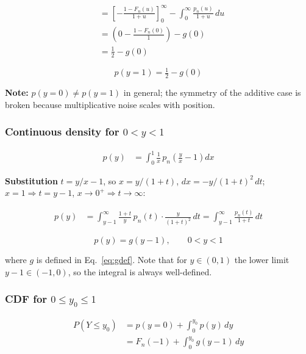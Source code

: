 \begin{align*}
  &= \left[-\frac{1-F_n(u)}{1+u}\right]_0^{\infty}
     - \int_0^{\infty} \frac{p_n(u)}{1+u}\,du \\
  &= \left(0 - \frac{1-F_n(0)}{1}\right) - g(0) \\
  &= \frac{1}{2} - g(0)
\end{align*}

\begin{equation}
  \boxed{p(y=1) = \tfrac{1}{2} - g(0)}
  \label{eq:mass1_mult}
\end{equation}

\textbf{Note:} $p(y=0) \neq p(y=1)$ in general; the symmetry of the additive
case is broken because multiplicative noise scales with position.

\subsubsection*{Continuous density for $0 < y < 1$}

\begin{align*}
  p(y)
    &= \int_0^1 \frac{1}{x}\,p_n\!\left(\frac{y}{x}-1\right)dx
\end{align*}

\textbf{Substitution} $t = y/x - 1$, so $x = y/(1+t)$,
$dx = -y/(1+t)^2\,dt$; $x=1 \Rightarrow t=y-1$,
$x \to 0^+ \Rightarrow t \to \infty$:

\begin{align*}
  p(y)
    &= \int_{y-1}^{\infty}
       \frac{1+t}{y}\,p_n(t)\cdot\frac{y}{(1+t)^2}\,dt
     = \int_{y-1}^{\infty} \frac{p_n(t)}{1+t}\,dt
\end{align*}

\begin{equation}
  \boxed{p(y) = g(y-1), \qquad 0 < y < 1}
  \label{eq:density_mult}
\end{equation}

where $g$ is defined in Eq.~\eqref{eq:gdef}.
Note that for $y \in (0,1)$ the lower limit $y-1 \in (-1,0)$, so the
integral is always well-defined. 

\subsubsection*{CDF for $0 \leq y_0 \leq 1$}

\begin{align*}
  P(Y \leq y_0)
    &= p(y=0) + \int_0^{y_0} p(y)\,dy \\
    &= F_n(-1) + \int_0^{y_0} g(y-1)\,dy
\end{align*}

